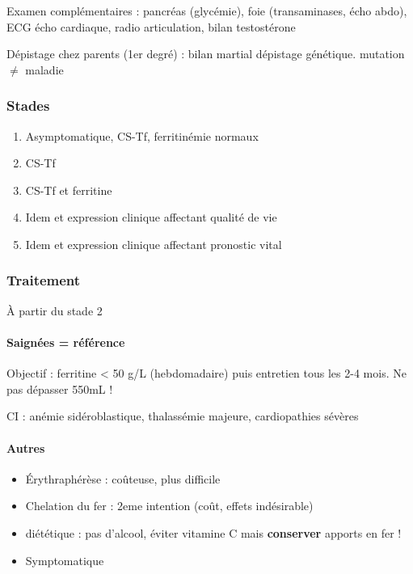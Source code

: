 \documentclass[11pt]{article}
\begin{document}
Examen complémentaires : pancréas (glycémie),  foie (transaminases, écho abdo), ECG \textpm{} écho
cardiaque, radio articulation, bilan testostérone

Dépistage chez parents (1er degré) : bilan martial \textpm{} dépistage génétique. \danger mutation \(\neq\) maladie

\subsubsection{Stades}
\label{sec:org94be75c}
\begin{enumerate}
\item Asymptomatique, CS-Tf, ferritinémie normaux
\item CS-Tf \inc
\item CS-Tf \inc et ferritine \inc
\item Idem et expression clinique affectant qualité de vie
\item Idem et expression clinique affectant pronostic vital
\end{enumerate}

\subsubsection{Traitement}
\label{sec:org6667087}
À partir du stade 2

\paragraph{Saignées = référence}
\label{sec:orga065ad9}
Objectif : ferritine < 50 g/L (hebdomadaire) puis entretien tous les
  2-4 mois. Ne pas dépasser 550mL !

CI : anémie sidéroblastique, thalassémie majeure, cardiopathies sévères

\paragraph{Autres}
\label{sec:org665d31f}
\begin{itemize}
\item Érythraphérèse : coûteuse, plus difficile
\item Chelation du fer : 2eme intention (coût, effets indésirable)
\item diététique : pas d'alcool, éviter vitamine C mais \textbf{conserver} apports en fer !
\item Symptomatique
\end{itemize}
\end{document}
